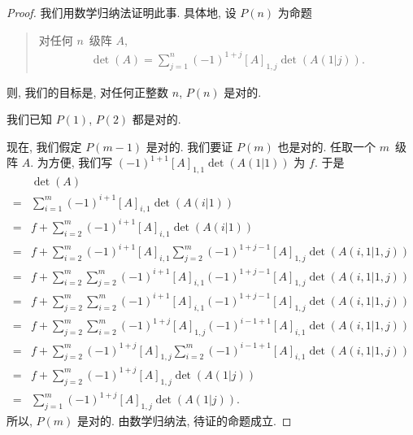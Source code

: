 \documentclass[../libro.tex]{subfiles}
\begin{document}
\begin{proof}
    我们用数学归纳法证明此事.
    具体地, 设 \(P(n)\) 为命题
    \begin{quotation}
        对任何 \(n\)~级阵 \(A\),
        \begin{align*}
            \det {(A)} =
            \sum_{j = 1}^{n} {(-1)^{1+j} [A]_{1,j} \det {(A(1|j))}}.
        \end{align*}
    \end{quotation}
    则, 我们的目标是,
    对任何正整数 \(n\), \(P(n)\) 是对的.

    我们已知 \(P(1)\), \(P(2)\) 都是对的.

    现在, 我们假定 \(P(m-1)\) 是对的.
    我们要证 \(P(m)\) 也是对的.
    任取一个 \(m\)~级阵 \(A\).
    为方便, 我们写
    \((-1)^{1+1} [A]_{1,1} \det {(A(1|1))}\)
    为 \(f\).
    于是%
    \begingroup
    \reqnomode
    \begin{align*}
        & \det {(A)} \\
        = {} &
        \sum_{i = 1}^{m} {
            (-1)^{i+1} [A]_{i,1} \det {(A(i|1))}
        }
        \tag*{(1)}
        \\
        = {} &
        f
        +
        \sum_{i = 2}^{m} {
            (-1)^{i+1} [A]_{i,1} \det {(A(i|1))}
        }
        \\
        = {} &
        f
        +
        \sum_{i = 2}^{m} {
            (-1)^{i+1} [A]_{i,1}
            \sum_{j = 2}^{m} {
                (-1)^{1+j-1} [A]_{1,j} \det {(A(i,1|1,j))}
            }
        }
        \tag*{(2)}
        \\
        = {} &
        f
        +
        \sum_{i = 2}^{m} {
            \sum_{j = 2}^{m} {
                (-1)^{i+1} [A]_{i,1}
                (-1)^{1+j-1} [A]_{1,j} \det {(A(i,1|1,j))}
            }
        }
        \tag*{(3)}
        \\
        = {} &
        f
        +
        \sum_{j = 2}^{m} {
            \sum_{i = 2}^{m} {
                (-1)^{i+1} [A]_{i,1}
                (-1)^{1+j-1} [A]_{1,j} \det {(A(i,1|1,j))}
            }
        }
        \tag*{(4)}
        \\
        = {} &
        f
        +
        \sum_{j = 2}^{m} {
            \sum_{i = 2}^{m} {
                (-1)^{1+j} [A]_{1,j}
                (-1)^{i-1+1} [A]_{i,1} \det {(A(i,1|1,j))}
            }
        }
        \tag*{(5)}
        \\
        = {} &
        f
        +
        \sum_{j = 2}^{m} {
            (-1)^{1+j} [A]_{1,j}
            \sum_{i = 2}^{m} {
                (-1)^{i-1+1} [A]_{i,1} \det {(A(i,1|1,j))}
            }
        }
        \tag*{(6)}
        \\
        = {} &
        f
        +
        \sum_{j = 2}^{m} {
            (-1)^{1+j} [A]_{1,j} \det {(A(1|j))}
        }
        \tag*{(7)}
        \\
        = {} &
        \sum_{j = 1}^{m} {
            (-1)^{1+j} [A]_{1,j} \det {(A(1|j))}
        }.
    \end{align*}%
    \endgroup
    所以, \(P(m)\) 是对的.
    由数学归纳法, 待证的命题成立.


\end{proof}
\end{document}
